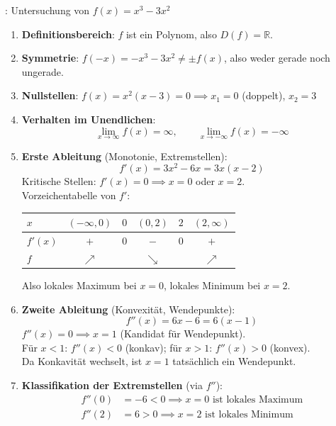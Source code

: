 \begin{minipage}{\linewidth}
\Bsp {}: Untersuchung von $f(x) = x^3 - 3x^2$
\begin{enumerate}
    \item \textbf{Definitionsbereich}: $f$ ist ein Polynom, also $D(f) = \mathbb{R}$.

    \item \textbf{Symmetrie}: $f(-x) = -x^3 - 3x^2 \neq \pm f(x)$, also weder gerade noch ungerade.

    \item \textbf{Nullstellen}: $f(x) = x^2(x - 3) = 0 \implies x_1 = 0$ (doppelt), $x_2 = 3$

    \item \textbf{Verhalten im Unendlichen}:
    $$\lim_{x\to\infty} f(x) = \infty, \qquad \lim_{x\to-\infty} f(x) = -\infty$$

    \item \textbf{Erste Ableitung} (Monotonie, Extremstellen):
    $$f'(x) = 3x^2 - 6x = 3x(x - 2)$$
    Kritische Stellen: $f'(x) = 0 \implies x = 0$ oder $x = 2$. \\
    Vorzeichentabelle von $f'$:
    \begin{center}
    \begin{tabular}{l|ccccc}
        $x$ & $(-\infty, 0)$ & $0$ & $(0, 2)$ & $2$ & $(2, \infty)$ \\
        \hline
        $f'(x)$ & $+$ & $0$ & $-$ & $0$ & $+$ \\
        $f$ & $\nearrow$ & & $\searrow$ & & $\nearrow$
    \end{tabular}
    \end{center}
    Also lokales Maximum bei $x=0$, lokales Minimum bei $x=2$.

    \item \textbf{Zweite Ableitung} (Konvexität, Wendepunkte):
    $$f''(x) = 6x - 6 = 6(x - 1)$$
    $f''(x) = 0 \implies x = 1$ (Kandidat für Wendepunkt). \\
    Für $x < 1$: $f''(x) < 0$ (konkav); für $x > 1$: $f''(x) > 0$ (konvex). \\
    Da Konkavität wechselt, ist $x = 1$ tatsächlich ein Wendepunkt.

    \item \textbf{Klassifikation der Extremstellen} (via $f''$):
    \begin{align*}
        f''(0) &= -6 < 0 \implies x = 0 \text{ ist lokales Maximum} \\[-0.3em]
        f''(2) &= 6 > 0 \implies x = 2 \text{ ist lokales Minimum}
    \end{align*}


\end{enumerate}
\end{minipage}
